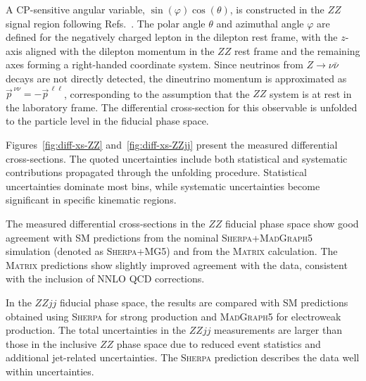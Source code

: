 A CP-sensitive angular variable, $\sin(\varphi)\cos(\theta)$, is constructed in the $ZZ$ signal region following Refs.~\cite{Chang:1994cs, STDM-2021-05, Semushin:2025uts}. The polar angle $\theta$ and azimuthal angle $\varphi$ are defined for the negatively charged lepton in the dilepton rest frame, with the $z$-axis aligned with the dilepton momentum in the $ZZ$ rest frame and the remaining axes forming a right-handed coordinate system. Since neutrinos from $Z\to\nu\bar{\nu}$ decays are not directly detected, the dineutrino momentum is approximated as $\vec{p}^{\,\nu\nu}=-\vec{p}^{\,\ell\ell}$, corresponding to the assumption that the $ZZ$ system is at rest in the laboratory frame. The differential cross-section for this observable is unfolded to the particle level in the fiducial phase space.

Figures~\ref{fig:diff-xs-ZZ} and~\ref{fig:diff-xs-ZZjj} present the measured differential cross-sections. The quoted uncertainties include both statistical and systematic contributions propagated through the unfolding procedure. Statistical uncertainties dominate most bins, while systematic uncertainties become significant in specific kinematic regions.

The measured differential cross-sections in the $ZZ$ fiducial phase space show good agreement with SM predictions from the nominal \textsc{Sherpa}+\textsc{MadGraph5} simulation (denoted as \textsc{Sherpa+MG5}) and from the \textsc{Matrix} calculation. The \textsc{Matrix} predictions show slightly improved agreement with the data, consistent with the inclusion of NNLO QCD corrections.

In the $ZZjj$ fiducial phase space, the results are compared with SM predictions obtained using \textsc{Sherpa} for strong production and \textsc{MadGraph5} for electroweak production. The total uncertainties in the $ZZjj$ measurements are larger than those in the inclusive $ZZ$ phase space due to reduced event statistics and additional jet-related uncertainties. The \textsc{Sherpa} prediction describes the data well within uncertainties.


